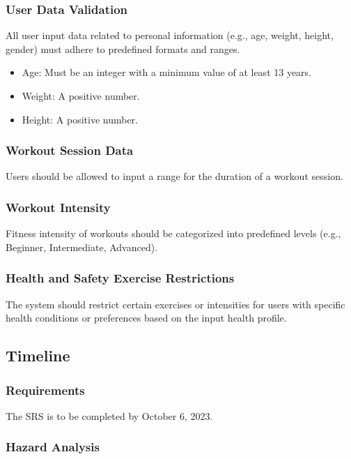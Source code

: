 \documentclass[12pt]{article}
\begin{document}
\subsubsection{User Data Validation}

All user input data related to personal information (e.g., age, weight, height, gender) must adhere to predefined formats and ranges.

\begin{itemize}
  \item Age: Must be an integer with a minimum value of at least 13 years.
  \item Weight: A positive number.
  \item Height: A positive number.
\end{itemize}

\subsubsection{Workout Session Data}

Users should be allowed to input a range for the duration of a workout session.

\subsubsection{Workout Intensity}

Fitness intensity of workouts should be categorized into predefined levels (e.g., Beginner, Intermediate, Advanced).

\subsubsection{Health and Safety Exercise Restrictions}

The system should restrict certain exercises or intensities for users with specific health conditions or preferences based on the input health profile.

\subsection{Timeline}

\subsubsection{Requirements}

The SRS is to be completed by October 6, 2023.

\subsubsection{Hazard Analysis}
\end{document}
